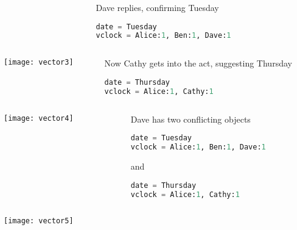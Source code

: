 \documentclass[aspectratio=169, 15pt,usenames,dvipsnames]{beamer}
\begin{document}
{\begin{gdblank}
\begin{columns}
\begin{column}{0.5\textwidth}
		\end{column}
		\begin{column}{0.5\textwidth}				
			Dave replies, confirming Tuesday
			\begin{lstlisting}[language=Python]
date = Tuesday
vclock = Alice:1, Ben:1, Dave:1
			\end{lstlisting}
		\end{column}	
	\end{columns} 
	\end{gdblank}
	\cprotEnv\begin{gdblank}
	\begin{columns}
		\begin{column}{0.5\textwidth}
			\texttt{[image: vector3]}			
		\end{column}
		\begin{column}{0.5\textwidth}				
			Now Cathy gets into the act, suggesting Thursday
			\begin{lstlisting}[language=Python]
date = Thursday
vclock = Alice:1, Cathy:1
			\end{lstlisting}
		\end{column}	
	\end{columns} 
	\end{gdblank}
	\cprotEnv\begin{gdblank}
	\begin{columns}
		\begin{column}{0.5\textwidth}
			\texttt{[image: vector4]}			
		\end{column}
		\begin{column}{0.5\textwidth}				
			Dave has two conflicting objects
			\begin{lstlisting}[language=Python]
date = Tuesday
vclock = Alice:1, Ben:1, Dave:1
			\end{lstlisting}
			and
			\begin{lstlisting}[language=Python]
date = Thursday
vclock = Alice:1, Cathy:1
			\end{lstlisting}
		\end{column}	
	\end{columns} 
	\end{gdblank}
	\cprotEnv\begin{gdblank}
	\begin{columns}
		\begin{column}{0.5\textwidth}
			\texttt{[image: vector5]}			
		\end{column}
		\begin{column}{0.5\textwidth}				

\end{column}
\end{columns}
\end{gdblank}}
\end{document}
